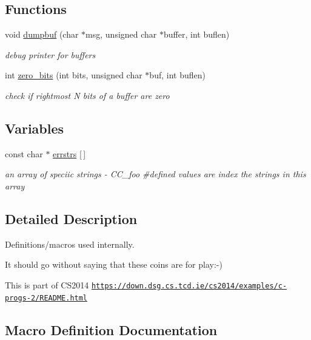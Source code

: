 \subsection*{Functions}
\begin{DoxyCompactItemize}
\item 
void \hyperlink{cs2014coin-int_8h_afd151090a1b9f8e9a800daa05be4bbf6}{dumpbuf} (char $\ast$msg, unsigned char $\ast$buffer, int buflen)
\begin{DoxyCompactList}\small\item\em debug printer for buffers \end{DoxyCompactList}\item 
int \hyperlink{cs2014coin-int_8h_a703c5c765e9038368f07fa48d3a89934}{zero\+\_\+bits} (int bits, unsigned char $\ast$buf, int buflen)
\begin{DoxyCompactList}\small\item\em check if rightmost N bits of a buffer are zero \end{DoxyCompactList}\end{DoxyCompactItemize}
\subsection*{Variables}
\begin{DoxyCompactItemize}
\item 
const char $\ast$ \hyperlink{cs2014coin-int_8h_a8e3da0eb987e1e7cd239012fe8d18655}{errstrs} \mbox{[}$\,$\mbox{]}
\begin{DoxyCompactList}\small\item\em an array of speciic strings -\/ C\+C\+\_\+foo \#define\textquotesingle{}d values are index the strings in this array \end{DoxyCompactList}\end{DoxyCompactItemize}


\subsection{Detailed Description}
Definitions/macros used internally. 

It should go without saying that these coins are for play\+:-\/)

This is part of C\+S2014 \href{https://down.dsg.cs.tcd.ie/cs2014/examples/c-progs-2/README.html}{\tt https\+://down.\+dsg.\+cs.\+tcd.\+ie/cs2014/examples/c-\/progs-\/2/\+R\+E\+A\+D\+M\+E.\+html} 

\subsection{Macro Definition Documentation}
\mbox{\label{cs2014coin-int_8h_a0f02326e76cf787367d95020eac57531}} 
